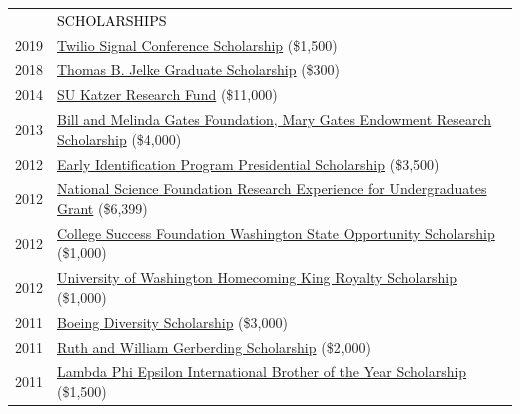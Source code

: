 \documentclass[12pt]{article}
\begin{document}
{\begin{longtable}{R{0.75in}p{5.0in}}
& \large \textcolor{black}{\uppercase{Scholarships}}\\

\footnotesize{2019} & \href{https://signal.twilio.com/}{Twilio Signal Conference Scholarship} (\$1,500)\\

\footnotesize{2018} & \href{https://www.afa1976.org/foundation}{Thomas B. Jelke Graduate Scholarship} (\$300)\\

\footnotesize{2014} & \href{https://youtu.be/kFmO44rs3-c}{SU Katzer Research Fund} (\$11,000)\\

\footnotesize{2013} & \href{https://www.washington.edu/uaa/tag/mary-gates-endowment-for-students/#BryanDosono}{Bill and Melinda Gates Foundation, Mary Gates Endowment Research Scholarship} (\$4,000)\\

\footnotesize{2012} & \href{https://web.archive.org/web/20250519052345/https://expo.uw.edu/expo/apply/278/proceedings/offering_session/510}{Early Identification Program Presidential Scholarship} (\$3,500)\\

\footnotesize{2012} & \href{https://www.nsf.gov/funding/initiatives/reu}{National Science Foundation Research Experience for Undergraduates Grant} (\$6,399)\\

\footnotesize{2012} & \href{https://www.waopportunityscholarship.org/}{College Success Foundation Washington State Opportunity Scholarship} (\$1,000)\\

\footnotesize{2012} & \href{https://www.washington.edu/uaa/2013/06/28/oh-the-places-theyll-go-new-grads-and-their-plans/bryan-dosono/}{University of Washington Homecoming King Royalty Scholarship} (\$1,000)\\

\footnotesize{2011} & \href{https://ischool.uw.edu/news/2016/12/bryan-dosono-informatics-student-speaks-boeing-scholarship-breakfast}{Boeing Diversity Scholarship} (\$3,000)\\

\footnotesize{2011} & \href{https://www.washington.edu/omad/2011/05/17/assunta-ng-student-scholars-honored-at-41st-annual-eop-celebration/}{Ruth and William Gerberding Scholarship} (\$2,000)\\

\footnotesize{2011} & \href{https://lambdaphiepsilon.org/resources/\#academicachievement}{Lambda Phi Epsilon International Brother of the Year Scholarship} (\$1,500)\\


\end{longtable}}
\end{document}
